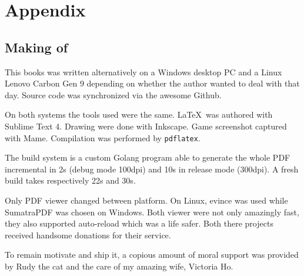 \chapter{Appendix} 

\section{Making of}

This books was written alternatively on a Windows desktop PC and a Linux Lenovo Carbon Gen 9 depending on whether the author wanted to deal with  that day. Source code was synchronized via the awesome Github.

On both systems the tools used were the same. \LaTeX\ was authored with Sublime Text 4. Drawing were done with Inkscape. Game screenshot captured with Mame. Compilation was performed by \texttt{pdflatex}.

The build system is a custom Golang program able to generate the whole PDF incremental in 2s (debug mode 100dpi) and 10s in release mode (300dpi). A fresh build takes respectively 22s and 30s.

Only PDF viewer changed between platform. On Linux, evince was used while SumatraPDF was chosen on Windows. Both viewer were not only amazingly fast, they also supported auto-reload which was a life safer. Both there projects received handsome donations for their service.

To remain motivate and ship it, a copious amount of moral support was provided by Rudy the cat and the care of my amazing wife, Victoria Ho.
